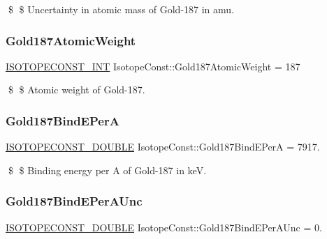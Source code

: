 \$ \$ Uncertainty in atomic mass of Gold-\/187 in amu. \mbox{\label{group___isotope_const-_gold-_au187_gae6f726b3981b802d216d5f5ca25e284e}} 
\subsubsection{\texorpdfstring{Gold187\+Atomic\+Weight}{Gold187AtomicWeight}}
{\footnotesize\ttfamily \mbox{\hyperlink{group___isotope_const-_macros_ga5f18360b3e99483a35c32d789e62621c}{I\+S\+O\+T\+O\+P\+E\+C\+O\+N\+S\+T\+\_\+\+I\+NT}} Isotope\+Const\+::\+Gold187\+Atomic\+Weight = 187}

\$ \$ Atomic weight of Gold-\/187. \mbox{\label{group___isotope_const-_gold-_au187_gadc53e8a7b13353ca153545c86230bc63}} 
\subsubsection{\texorpdfstring{Gold187\+Bind\+E\+PerA}{Gold187BindEPerA}}
{\footnotesize\ttfamily \mbox{\hyperlink{group___isotope_const-_macros_ga8f45a7272ce02c0b4c65c44636ed719a}{I\+S\+O\+T\+O\+P\+E\+C\+O\+N\+S\+T\+\_\+\+D\+O\+U\+B\+LE}} Isotope\+Const\+::\+Gold187\+Bind\+E\+PerA = 7917.}

\$ \$ Binding energy per A of Gold-\/187 in keV. \mbox{\label{group___isotope_const-_gold-_au187_ga72cce29858554a8ce0702059bc1211d1}} 
\subsubsection{\texorpdfstring{Gold187\+Bind\+E\+Per\+A\+Unc}{Gold187BindEPerAUnc}}
{\footnotesize\ttfamily \mbox{\hyperlink{group___isotope_const-_macros_ga8f45a7272ce02c0b4c65c44636ed719a}{I\+S\+O\+T\+O\+P\+E\+C\+O\+N\+S\+T\+\_\+\+D\+O\+U\+B\+LE}} Isotope\+Const\+::\+Gold187\+Bind\+E\+Per\+A\+Unc = 0.}

